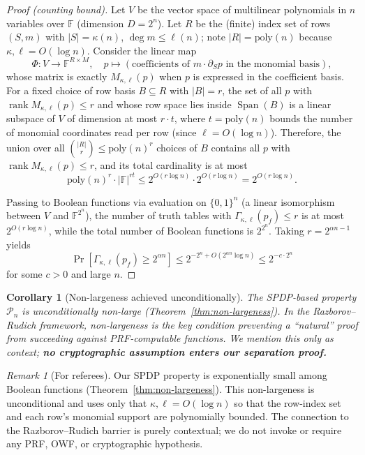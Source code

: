 \documentclass[12pt]{article}
\newtheorem{corollary}[theorem]{Corollary}
\theoremstyle{definition}
\theoremstyle{definition}
\theoremstyle{remark}
\newtheorem{remark}{Remark}
\theoremstyle{remark}
\begin{document}
\begin{proof}[Proof (counting bound)]
Let $V$ be the vector space of multilinear polynomials in $n$ variables over $\mathbb{F}$ (dimension $D = 2^n$). Let $R$ be the (finite) index set of rows $(S,m)$ with $|S| = \kappa(n)$, $\deg m \leq \ell(n)$; note $|R| = \mathrm{poly}(n)$ because $\kappa, \ell = O(\log n)$. Consider the linear map
\[
\Phi : V \longrightarrow \mathbb{F}^{R \times M}, \quad p \mapsto (\text{coefficients of } m \cdot \partial_S p \text{ in the monomial basis}),
\]
whose matrix is exactly $M_{\kappa,\ell}(p)$ when $p$ is expressed in the coefficient basis. For a fixed choice of row basis $B \subseteq R$ with $|B| = r$, the set of all $p$ with $\operatorname{rank} M_{\kappa,\ell}(p) \leq r$ and whose row space lies inside $\operatorname{Span}(B)$ is a linear subspace of $V$ of dimension at most $r \cdot t$, where $t = \mathrm{poly}(n)$ bounds the number of monomial coordinates read per row (since $\ell = O(\log n)$). Therefore, the union over all $\binom{|R|}{r} \leq \mathrm{poly}(n)^r$ choices of $B$ contains all $p$ with $\operatorname{rank} M_{\kappa,\ell}(p) \leq r$, and its total cardinality is at most
\[
\mathrm{poly}(n)^r \cdot |\mathbb{F}|^{rt} \leq 2^{O(r \log n)} \cdot 2^{O(r \log n)} = 2^{O(r \log n)}.
\]

Passing to Boolean functions via evaluation on $\{0,1\}^n$ (a linear isomorphism between $V$ and $\mathbb{F}^{2^n}$), the number of truth tables with $\Gamma_{\kappa,\ell}(p_f) \leq r$ is at most $2^{O(r \log n)}$, while the total number of Boolean functions is $2^{2^n}$. Taking $r = 2^{\alpha n - 1}$ yields
\[
\Pr[\Gamma_{\kappa,\ell}(p_f) \geq 2^{\alpha n}] \leq 2^{-2^n + O(2^{\alpha n} \log n)} \leq 2^{-c \cdot 2^n}
\]
for some $c > 0$ and large $n$.
\end{proof}

\begin{corollary}[Non-largeness achieved unconditionally]\label{cor:natural-avoided}
The SPDP-based property $\mathcal{P}_n$ is unconditionally non-large (Theorem~\ref{thm:non-largeness}).
In the Razborov--Rudich framework, non-largeness is the key condition preventing a ``natural'' proof from
succeeding against PRF-computable functions. We mention this only as context; \textbf{no cryptographic
assumption enters our separation proof.}
\end{corollary}

\begin{remark}[For referees]
Our SPDP property is exponentially small among Boolean functions (Theorem~\ref{thm:non-largeness}).
This non-largeness is unconditional and uses only that $\kappa, \ell = O(\log n)$ so that the row-index set
and each row's monomial support are polynomially bounded. The connection to the Razborov--Rudich barrier
is purely contextual; we do not invoke or require any PRF, OWF, or cryptographic hypothesis.
\end{remark}
\end{document}
